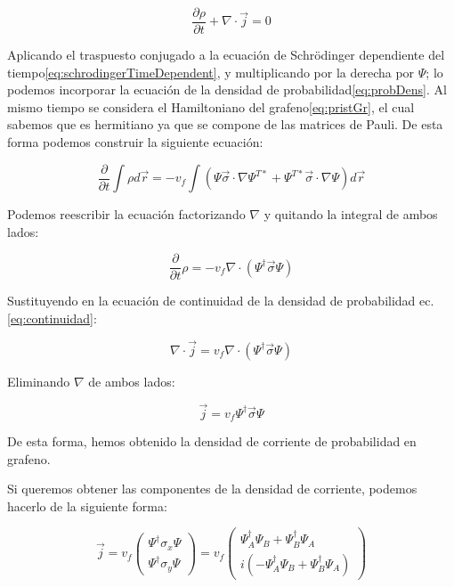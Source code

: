     \begin{equation}
        \label{eq:continuidad}
        \frac{\partial\rho}{\partial t} + \nabla\cdot\vec{j}=0
    \end{equation}

    Aplicando el traspuesto conjugado a la ecuación de Schrödinger dependiente del tiempo\eqref{eq:schrodingerTimeDependent}, y multiplicando por la derecha por $\Psi$; lo podemos incorporar la ecuación de la densidad de probabilidad\eqref{eq:probDens}.
    Al mismo tiempo se considera el Hamiltoniano del grafeno\eqref{eq:pristGr}, el cual sabemos que es hermitiano ya que se compone de las matrices de Pauli.
    De esta forma podemos construir la siguiente ecuación:

    \begin{equation}
        \label{eq:rho_sigma_nabla}
        \frac{\partial}{\partial t}\int\rho d\vec{r} = -v_f\int\left( \Psi\vec{\sigma}\cdot\nabla\Psi^{T*} + \Psi^{T*}\vec{\sigma}\cdot\nabla\Psi \right)d\vec{r}
    \end{equation}

    Podemos reescribir la ecuación factorizando $\nabla$ y quitando la integral de ambos lados:

    \begin{equation}
        \label{eq:casi_j}
        \frac{\partial}{\partial t}\rho = -v_f\nabla\cdot\left( \Psi^\dagger \vec{\sigma} \Psi \right)
    \end{equation}

    Sustituyendo en la ecuación de continuidad de la densidad de probabilidad ec.\eqref{eq:continuidad}:

    \begin{equation}
        \label{eq:nablaJ}
        \nabla\cdot\vec{j} = v_f\nabla\cdot\left( \Psi^\dagger \vec{\sigma} \Psi \right)
    \end{equation}

    Eliminando $\nabla$ de ambos lados:

    \begin{equation}
        \label{eq:final}
        \vec{j} = v_f\Psi^\dagger \vec{\sigma} \Psi
    \end{equation}

    De esta forma, hemos obtenido la densidad de corriente de probabilidad en grafeno.

    Si queremos obtener las componentes de la densidad de corriente, podemos hacerlo de la siguiente forma:

    \begin{equation}
        \label{eq:componentes}
        \vec{j} = v_f\begin{pmatrix} \Psi^\dagger \sigma_x \Psi \\ \Psi^\dagger \sigma_y \Psi \end{pmatrix} = v_f\begin{pmatrix} \Psi_A^\dagger\Psi_B + \Psi_B^\dagger\Psi_A \\ i(-\Psi_A^\dagger\Psi_B + \Psi_B^\dagger\Psi_A) \end{pmatrix}
    \end{equation}

